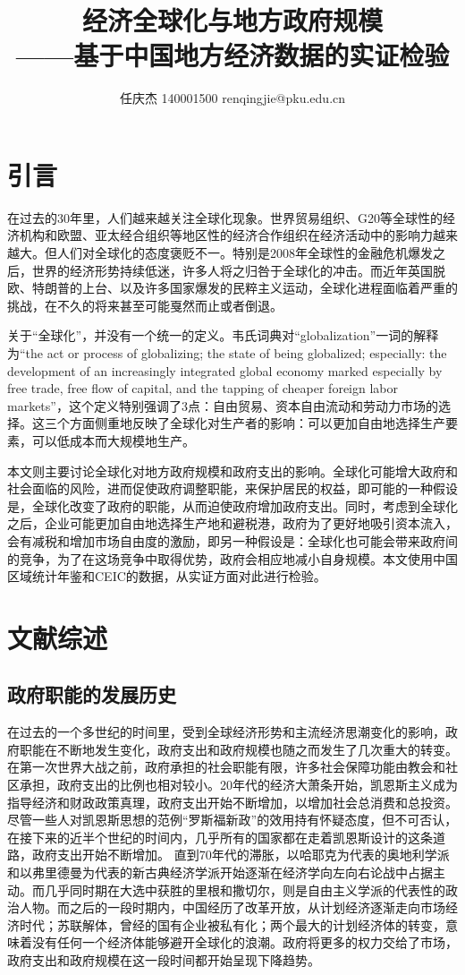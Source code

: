 \documentclass[10pt]{article}
\author{任庆杰  140001500  renqingjie@pku.edu.cn}
\title{经济全球化与地方政府规模\\
——基于中国地方经济数据的实证检验}
\begin{document}
\maketitle{}
\section{引言}
在过去的30年里，人们越来越关注全球化现象。世界贸易组织、G20等全球性的经济机构和欧盟、亚太经合组织等地区性的经济合作组织在经济活动中的影响力越来越大。但人们对全球化的态度褒贬不一。特别是2008年全球性的金融危机爆发之后，世界的经济形势持续低迷，许多人将之归咎于全球化的冲击。而近年英国脱欧、特朗普的上台、以及许多国家爆发的民粹主义运动，全球化进程面临着严重的挑战，在不久的将来甚至可能戛然而止或者倒退。

关于“全球化”，并没有一个统一的定义。韦氏词典对“globalization”一词的解释为“the act or process of globalizing; the state of being globalized; especially: the development of an increasingly integrated global economy marked especially by free trade, free flow of capital, and the tapping of cheaper foreign labor markets”，这个定义特别强调了3点：自由贸易、资本自由流动和劳动力市场的选择。这三个方面侧重地反映了全球化对生产者的影响：可以更加自由地选择生产要素，可以低成本而大规模地生产。

本文则主要讨论全球化对地方政府规模和政府支出的影响。全球化可能增大政府和社会面临的风险，进而促使政府调整职能，来保护居民的权益，即可能的一种假设是，全球化改变了政府的职能，从而迫使政府增加政府支出。同时，考虑到全球化之后，企业可能更加自由地选择生产地和避税港，政府为了更好地吸引资本流入，会有减税和增加市场自由度的激励，即另一种假设是：全球化也可能会带来政府间的竞争，为了在这场竞争中取得优势，政府会相应地减小自身规模。本文使用中国区域统计年鉴和CEIC的数据，从实证方面对此进行检验。

\section{文献综述}
\subsection{政府职能的发展历史}
在过去的一个多世纪的时间里，受到全球经济形势和主流经济思潮变化的影响，政府职能在不断地发生变化，政府支出和政府规模也随之而发生了几次重大的转变。在第一次世界大战之前，政府承担的社会职能有限，许多社会保障功能由教会和社区承担，政府支出的比例也相对较小\cite{Beito2002The}。20年代的经济大萧条开始，凯恩斯主义成为指导经济和财政政策真理，政府支出开始不断增加，以增加社会总消费和总投资。尽管一些人对凯恩斯思想的范例“罗斯福新政”的效用持有怀疑态度\cite{rothbard1972america}，但不可否认，在接下来的近半个世纪的时间内，几乎所有的国家都在走着凯恩斯设计的这条道路，政府支出开始不断增加。
直到70年代的滞胀，以哈耶克为代表的奥地利学派和以弗里德曼为代表的新古典经济学派开始逐渐在经济学向左向右论战中占据主动。而几乎同时期在大选中获胜的里根和撒切尔，则是自由主义学派的代表性的政治人物。而之后的一段时期内，中国经历了改革开放，从计划经济逐渐走向市场经济时代；苏联解体，曾经的国有企业被私有化；两个最大的计划经济体的转变，意味着没有任何一个经济体能够避开全球化的浪潮。政府将更多的权力交给了市场，政府支出和政府规模在这一段时间都开始呈现下降趋势。\added[remark={（表4.5）}]{}
\end{document}

